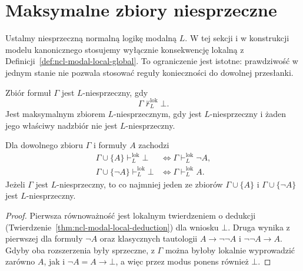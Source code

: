 \section{Maksymalne zbiory niesprzeczne}

Ustalmy niesprzeczną normalną logikę modalną $L$.
W tej sekcji i w konstrukcji modelu kanonicznego
stosujemy wyłącznie konsekwencję lokalną
z Definicji~\ref{def:ncl-modal-local-global}.
To ograniczenie jest istotne: prawdziwość
w jednym stanie nie pozwala stosować reguły
konieczności do dowolnej przesłanki.

\begin{definicja}
\label{def:ncl-kripke-consistency}
Zbiór formuł $\Gamma$ jest $L$-niesprzeczny, gdy
\[
 \Gamma\not\vdash_L^{\mathrm{lok}}\bot.
\]
Jest maksymalnym zbiorem $L$-niesprzecznym,
gdy jest $L$-niesprzeczny i żaden jego
właściwy nadzbiór nie jest $L$-niesprzeczny.
\end{definicja}

\begin{lemat}
\label{lem:ncl-kripke-consistency-extension}
Dla dowolnego zbioru $\Gamma$ i formuły $A$
zachodzi
\[
\begin{aligned}
 \Gamma\cup\{A\}\vdash_L^{\mathrm{lok}}\bot
 &\iff\Gamma\vdash_L^{\mathrm{lok}}\neg A,\\
 \Gamma\cup\{\neg A\}\vdash_L^{\mathrm{lok}}\bot
 &\iff\Gamma\vdash_L^{\mathrm{lok}} A.
\end{aligned}
\]
Jeżeli $\Gamma$ jest $L$-niesprzeczny,
to co najmniej jeden ze zbiorów
$\Gamma\cup\{A\}$ i $\Gamma\cup\{\neg A\}$
jest $L$-niesprzeczny.
\end{lemat}
\begin{proof}
Pierwsza równoważność jest lokalnym twierdzeniem
o dedukcji (Twierdzenie~\ref{thm:ncl-modal-local-deduction})
dla wniosku $\bot$. Druga wynika z pierwszej
dla formuły $\neg A$ oraz klasycznych tautologii
$A\to\neg\neg A$ i $\neg\neg A\to A$.
Gdyby oba rozszerzenia były sprzeczne,
z $\Gamma$ można byłoby lokalnie wyprowadzić
zarówno $A$, jak i $\neg A=A\to\bot$,
a więc przez modus ponens również $\bot$.
\end{proof}

